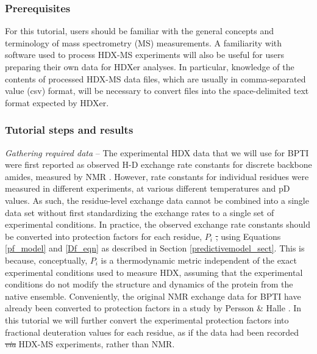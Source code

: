 \documentclass[9pt,tutorial]{livecoms}
\providecommand{\DIFadd}[1]{{\protect\color{blue}\uwave{#1}}} %
\providecommand{\DIFdel}[1]{{\protect\color{red}\sout{#1}}}                      %
\providecommand{\DIFaddbegin}{} %
\providecommand{\DIFaddend}{} %
\providecommand{\DIFdelbegin}{} %
\providecommand{\DIFdelend}{} %
\begin{document}
\subsubsection{Prerequisites}
For this tutorial, users should be familiar with the general concepts and terminology of mass spectrometry (MS) measurements. 
A familiarity with software used to process HDX-MS experiments will also be useful for users preparing their own data for HDXer analyses.
In particular, knowledge of the contents of processed HDX-MS data files, which are usually in comma-separated value (csv) format, will be necessary to convert files into the space-delimited text format expected by HDXer.

\subsubsection{Tutorial steps and results}

\textit{Gathering required data} -- The experimental HDX data that we will use for BPTI were first reported as observed H-D exchange rate constants for discrete backbone amides, measured by NMR \cite{Kim1993, Battiste2002}. 
However, rate constants for individual residues were measured in different experiments, at various different temperatures and pD values.
As such, the residue-level exchange data cannot be combined into a single data set without first standardizing the exchange rates to a single set of experimental conditions.
In practice, the observed exchange rate constants should be converted into protection factors for each residue, $P_i$ \DIFdelbegin \DIFdel{, }\DIFdelend using Equations \ref{pf_model} and \ref{Df_eqn} as described in Section \ref{predictivemodel_sect}.
This is because, conceptually, $P_i$ is a thermodynamic metric independent of the exact experimental conditions used to measure HDX, assuming that the experimental conditions do not modify the structure and dynamics of the protein from the native ensemble.
Conveniently, the original NMR exchange data for BPTI have already been converted to protection factors in a study by Persson \& Halle \cite{Persson2015}.
In this tutorial we will further convert the experimental protection factors into fractional deuteration values for each residue, as if the data had been recorded \DIFdelbegin \textit{\DIFdel{via}} %
\DIFdelend \DIFaddbegin \DIFadd{by }\DIFaddend HDX-MS experiments, rather than NMR. 
\end{document}
